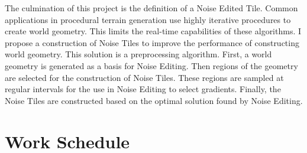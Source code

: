 \documentclass[12pt]{article}
\theoremstyle{definition}
\theoremstyle{remark}
\begin{document}
The culmination of this project is the definition of a Noise Edited Tile. Common applications in procedural terrain generation use highly iterative procedures to create world geometry. This limits the real-time capabilities of these algorithms. I propose a construction of Noise Tiles to improve the performance of constructing world geometry. This solution is a preprocessing algorithm. First, a world geometry is generated as a basis for Noise Editing. Then regions of the geometry are selected for the construction of Noise Tiles. These regions are sampled at regular intervals for the use in Noise Editing to select gradients. Finally, the Noise Tiles are constructed based on the optimal solution found by Noise Editing.

\singlespacing
\section{Work Schedule}
\doublespacing




\end{document}
